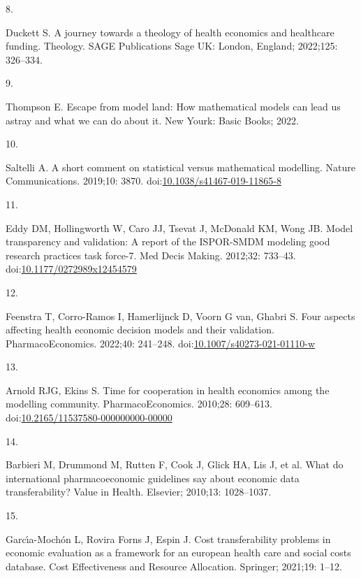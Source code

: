 \documentclass[
]{article}
\newlength{\cslhangindent}
\newlength{\csllabelwidth}
\newlength{\cslentryspacingunit} %
\newenvironment{CSLReferences}[2] %
 {%
  \setlength{\parindent}{0pt}
  \ifodd #1
  \let\oldpar\par
  \def\par{\hangindent=\cslhangindent\oldpar}
  \fi
  \setlength{\parskip}{#2\cslentryspacingunit}
 }%
 {}
\newcommand{\CSLLeftMargin}[1]{\parbox[t]{\csllabelwidth}{#1}}
\newcommand{\CSLRightInline}[1]{\parbox[t]{\linewidth - \csllabelwidth}{#1}\break}
\begin{document}
\begin{CSLReferences}{0}{0}
\leavevmode{}%
\CSLLeftMargin{8. }%
\CSLRightInline{Duckett S. A journey towards a theology of health economics and healthcare funding. Theology. SAGE Publications Sage UK: London, England; 2022;125: 326--334. }

\leavevmode{}%
\CSLLeftMargin{9. }%
\CSLRightInline{Thompson E. Escape from model land: How mathematical models can lead us astray and what we can do about it. New Yourk: Basic Books; 2022. }

\leavevmode{}%
\CSLLeftMargin{10. }%
\CSLRightInline{Saltelli A. A short comment on statistical versus mathematical modelling. Nature Communications. 2019;10: 3870. doi:\href{https://doi.org/10.1038/s41467-019-11865-8}{10.1038/s41467-019-11865-8}}

\leavevmode{}%
\CSLLeftMargin{11. }%
\CSLRightInline{Eddy DM, Hollingworth W, Caro JJ, Tsevat J, McDonald KM, Wong JB. Model transparency and validation: A report of the ISPOR-SMDM modeling good research practices task force-7. Med Decis Making. 2012;32: 733--43. doi:\href{https://doi.org/10.1177/0272989x12454579}{10.1177/0272989x12454579}}

\leavevmode{}%
\CSLLeftMargin{12. }%
\CSLRightInline{Feenstra T, Corro-Ramos I, Hamerlijnck D, Voorn G van, Ghabri S. Four aspects affecting health economic decision models and their validation. PharmacoEconomics. 2022;40: 241--248. doi:\href{https://doi.org/10.1007/s40273-021-01110-w}{10.1007/s40273-021-01110-w}}

\leavevmode{}%
\CSLLeftMargin{13. }%
\CSLRightInline{Arnold RJG, Ekins S. Time for cooperation in health economics among the modelling community. PharmacoEconomics. 2010;28: 609--613. doi:\href{https://doi.org/10.2165/11537580-000000000-00000}{10.2165/11537580-000000000-00000}}

\leavevmode{}%
\CSLLeftMargin{14. }%
\CSLRightInline{Barbieri M, Drummond M, Rutten F, Cook J, Glick HA, Lis J, et al. What do international pharmacoeconomic guidelines say about economic data transferability? Value in Health. Elsevier; 2010;13: 1028--1037. }

\leavevmode{}%
\CSLLeftMargin{15. }%
\CSLRightInline{Garcı́a-Mochón L, Rovira Forns J, Espin J. Cost transferability problems in economic evaluation as a framework for an european health care and social costs database. Cost Effectiveness and Resource Allocation. Springer; 2021;19: 1--12. }


\end{CSLReferences}
\end{document}
